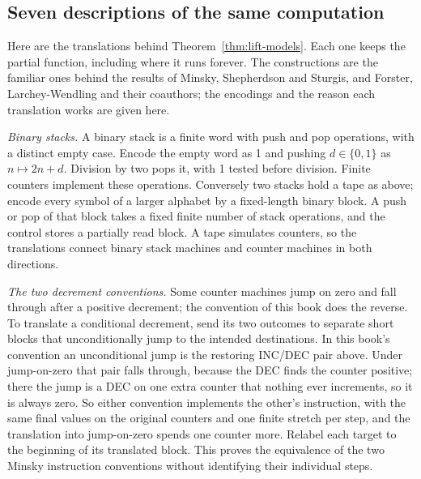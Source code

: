 \documentclass[11pt,twoside]{article}
\theoremstyle{thielethm}
\theoremstyle{thieledef}
\theoremstyle{thieledef}
\theoremstyle{thieledef}
\theoremstyle{thielethm}
\theoremstyle{thieleobs}
\theoremstyle{thielethm}
\begin{document}
\subsection{Seven descriptions of the same computation}
\label{sub:seven-constructions}

Here are the translations behind Theorem~\ref{thm:lift-models}. Each one keeps the
partial function, including where it runs forever. The constructions
are the familiar ones behind the results of Minsky, Shepherdson and Sturgis, and
Forster, Larchey-Wendling and their coauthors; the encodings and the reason each
translation works are given here.

\emph{Binary stacks.} A binary stack is a finite word with push and pop operations,
with a distinct empty case. Encode the empty word as 1 and pushing $d\in\{0,1\}$
as $n\mapsto2n+d$. Division by two pops it, with 1 tested before division.
Finite counters implement these operations. Conversely two stacks hold a tape as
above; encode every symbol of a larger alphabet by a fixed-length binary block.
A push or pop of that block takes a fixed finite number of stack operations, and the
control stores a partially read block. A tape simulates counters, so the translations
connect binary stack machines and counter machines in both directions.

\emph{The two decrement conventions.} Some counter machines jump on zero and
fall through after a positive decrement; the convention of this book does the reverse.
To translate a conditional decrement, send its two outcomes to separate short blocks
that unconditionally jump to the intended destinations. In this book's convention an unconditional jump is the restoring INC/DEC pair above. Under jump-on-zero that pair falls through, because the DEC finds the counter positive; there the jump is a DEC on one extra counter that nothing ever increments, so it is always zero. So either convention implements the other's instruction, with the same final values on the original counters and one finite stretch per step, and the translation into jump-on-zero spends one counter more. Relabel each target
to the beginning of its translated block. This proves the equivalence of the two Minsky
instruction conventions without identifying their individual steps.
\end{document}
